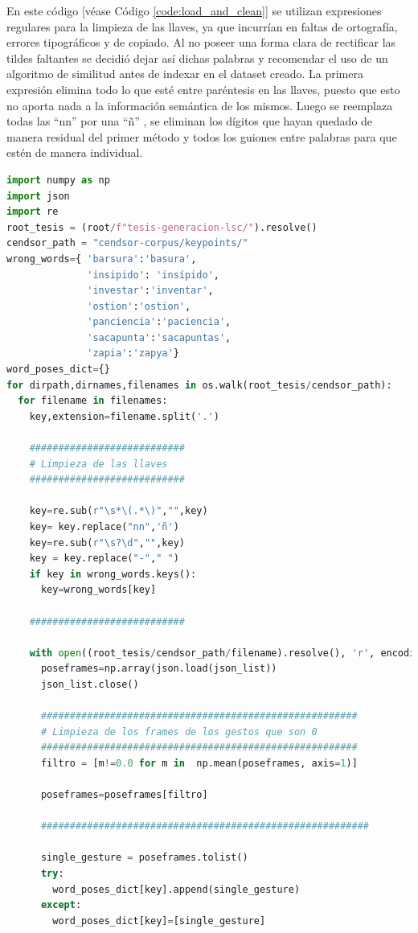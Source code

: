 En este código [véase Código \ref{code:load_and_clean}] se utilizan expresiones regulares para la limpieza de las llaves, ya que incurrían en faltas de ortografía, errores tipográficos y de copiado. Al no poseer una forma clara de rectificar las tildes faltantes se decidió dejar así dichas palabras y recomendar el uso de un algoritmo de similitud antes de indexar en el dataset creado.
La primera expresión elimina todo lo que esté entre paréntesis en las llaves, puesto que esto no aporta nada a la información semántica de los mismos. Luego se reemplaza todas las ``nn'' por una ``ñ'' 
, se eliminan los dígitos que hayan quedado de manera residual del primer método y todos los guiones entre palabras para que estén de manera individual.
\vspace{0.5cm}

\begin{lstlisting}[basicstyle=\tiny,language=Python, caption={Cargar los json y limpiar las llaves}, label={code:load_and_clean}]
import numpy as np
import json
import re
root_tesis = (root/f"tesis-generacion-lsc/").resolve()
cendsor_path = "cendsor-corpus/keypoints/"
wrong_words={ 'barsura':'basura',
              'insipido': 'insípido',
              'investar':'inventar',
              'ostion':'ostion',
              'panciencia':'paciencia',
              'sacapunta':'sacapuntas',
              'zapia':'zapya'}
word_poses_dict={}
for dirpath,dirnames,filenames in os.walk(root_tesis/cendsor_path):
  for filename in filenames:
    key,extension=filename.split('.')
	
	###########################
	# Limpieza de las llaves
	###########################
	
    key=re.sub(r"\s*\(.*\)","",key)
    key= key.replace("nn",'ñ')
    key=re.sub(r"\s?\d","",key)
    key = key.replace("-"," ") 
    if key in wrong_words.keys():
      key=wrong_words[key]
    
	###########################
	
    with open((root_tesis/cendsor_path/filename).resolve(), 'r', encoding='utf-8') as json_list:
      poseframes=np.array(json.load(json_list))
      json_list.close()
		
	  #######################################################
	  # Limpieza de los frames de los gestos que son 0
	  #######################################################
      filtro = [m!=0.0 for m in  np.mean(poseframes, axis=1)]
      
      poseframes=poseframes[filtro]

	  #########################################################
	  
      single_gesture = poseframes.tolist()
      try:
        word_poses_dict[key].append(single_gesture)
      except:
        word_poses_dict[key]=[single_gesture]      
\end{lstlisting}
